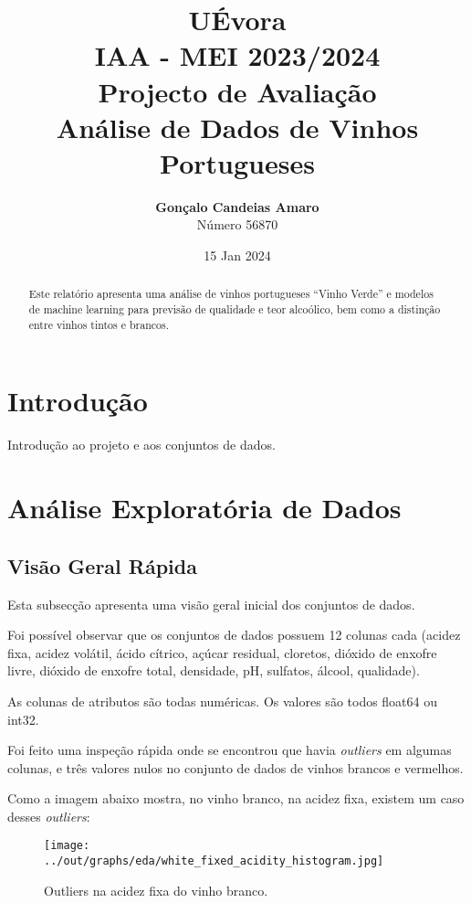 \documentclass{article}
\title{UÉvora\\IAA - MEI 2023/2024\\Projecto de Avaliação\\\textbf{Análise de Dados de Vinhos Portugueses}}
\author{\textbf{Gonçalo Candeias Amaro}\\Número 56870}
\date{15 Jan 2024}
\begin{document}
\maketitle

\begin{abstract}
Este relatório apresenta uma análise de vinhos portugueses ``Vinho Verde'' e modelos de machine learning para previsão de qualidade e teor alcoólico, bem como a distinção entre vinhos tintos e brancos.
\end{abstract}

\section{Introdução}
Introdução ao projeto e aos conjuntos de dados.

\section{Análise Exploratória de Dados}

\subsection{Visão Geral Rápida}
Esta subsecção apresenta uma visão geral inicial dos conjuntos de dados.

Foi possível observar que os conjuntos de dados possuem 12 colunas cada (acidez fixa, acidez volátil, ácido cítrico, açúcar residual, cloretos, dióxido de enxofre livre, dióxido de enxofre total, densidade, pH, sulfatos, álcool, qualidade).

As colunas de atributos são todas numéricas. Os valores são todos float64 ou int32.

Foi feito uma inspeção rápida onde se encontrou que havia \textit{outliers} em algumas colunas, e três valores nulos no conjunto de dados de vinhos brancos e vermelhos.

Como a imagem abaixo mostra, no vinho branco, na acidez fixa, existem um caso desses \textit{outliers}:

\begin{figure}
  \centering
  \begin{minipage}{0.90\textwidth}
    \centering
    \texttt{[image: ../out/graphs/eda/white\_fixed\_acidity\_histogram.jpg]}
    \caption{Outliers na acidez fixa do vinho branco.}
    \label{fig:white_fixed_acidity}
  \end{minipage}
\end{figure}
\end{document}
